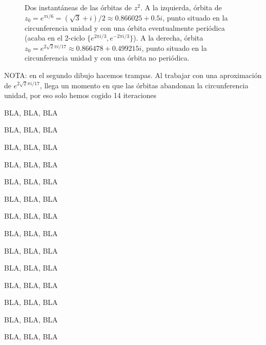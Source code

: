 \documentclass[11pt,a4paper]{article}
\begin{document}
\begin{figure}[htbp]
\begin{center}
\caption{Dos instantáneas de las órbitas de $z^2$. A la izquierda, órbita de $z_0=e^{\pi i/6}=(\sqrt{3}+ i)/2\approx 0.866025+0.5i$, punto situado en la circunferencia unidad y con una órbita eventualmente periódica (acaba en el 2-ciclo  $\{e^{2\pi i/3},e^{-2\pi i/3}\}$). A la derecha, órbita $z_0=e^{2\sqrt{2}\pi i/17}\approx 0.866478 + 0.499215i$, punto situado en la circunferencia unidad y con una órbita no periódica. }
\label{Fig:2}
\end{center}
\end{figure}

NOTA: en el segundo dibujo hacemos trampas. Al  trabajar con una aproximación de $e^{2\sqrt{2}\pi i/17}$, llega un momento en que las órbitas abandonan la circunferencia unidad, por eso solo hemos cogido 14 iteraciones


BLA, BLA, BLA

BLA, BLA, BLA

BLA, BLA, BLA

BLA, BLA, BLA

BLA, BLA, BLA

BLA, BLA, BLA

BLA, BLA, BLA

BLA, BLA, BLA

BLA, BLA, BLA

BLA, BLA, BLA

BLA, BLA, BLA

BLA, BLA, BLA

BLA, BLA, BLA

BLA, BLA, BLA
\end{document}
